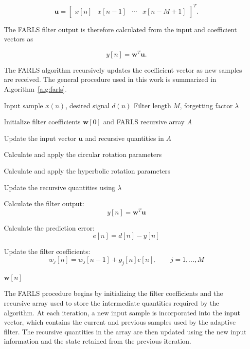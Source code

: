 \begin{equation}
\mathbf{u} =
\begin{bmatrix}
x[n] & x[n-1] & \cdots & x[n-M+1]
\end{bmatrix}^{T}.
\end{equation}

The FARLS filter output is therefore calculated from the input and coefficient vectors as

\begin{equation}
y[n] = \mathbf{w}^{T}\mathbf{u}.
\end{equation}

The FARLS algorithm recursively updates the coefficient vector as new samples are received. The general procedure used in this work is summarized in Algorithm~\ref{alg:farls}.

\begin{algorithm}[H]
\caption{FARLS Adaptive Filtering Procedure}
\label{alg:farls}
\begin{algorithmic}

\Require Input sample $x(n)$, desired signal $d(n)$
\Require Filter length $M$, forgetting factor $\lambda$

\State Initialize filter coefficients $\mathbf{w}[0]$ and FARLS recursive array $A$


\State Update the input vector $\mathbf{u}$ and recursive quantities in $A$

\State Calculate and apply the circular rotation parameters

\State Calculate and apply the hyperbolic rotation parameters

\State Update the recursive quantities using $\lambda$

\State Calculate the filter output:
\[
y[n] = \mathbf{w}^{T}\mathbf{u}
\]

\State Calculate the prediction error:
\[
e[n] = d[n]-y[n]
\]

\State Update the filter coefficients:
\[
w_j[n] = w_j[n-1] + g_j[n]e[n],
\qquad j=1,\ldots,M
\]

\EndFor

\State \Return $\mathbf{w}[n]$

\end{algorithmic}
\end{algorithm}

The FARLS procedure begins by initializing the filter coefficients and the recursive array used to store the intermediate quantities required by the algorithm. At each iteration, a new input sample is incorporated into the input vector, which contains the current and previous samples used by the adaptive filter. The recursive quantities in the array are then updated using the new input information and the state retained from the previous iteration.

